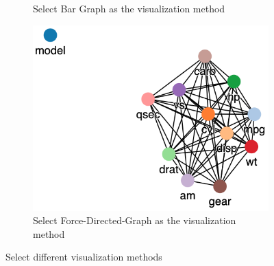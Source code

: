 \begin{figure}[h]
\begin{subfigure}[b]{0.32\textwidth}
	\caption{Select Bar Graph as the visualization method}
		\label{fig:chooseBar}
\end{subfigure}
\hfill
\begin{subfigure}[b]{0.32\textwidth}
	\centering
	\includegraphics[width=\textwidth]{pictures/fdg}
	\caption{Select Force-Directed-Graph as the visualization method}
		\label{fig:chooseFDG}
\end{subfigure}
	\caption{Select different visualization methods}
	\label{fig:choose}
\end{figure}









